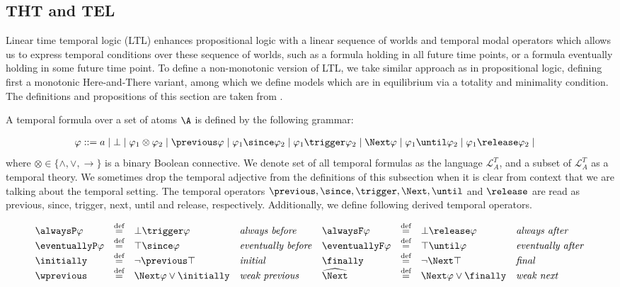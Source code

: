 \subsection{THT and TEL}

Linear time temporal logic (LTL) enhances propositional logic with a
linear sequence of worlds and temporal modal operators which allows us
to express temporal conditions over these sequence of worlds, such as
a formula holding in all future time points, or a formula eventually
holding in some future time point. To define a non-monotonic version
of LTL, we take similar approach as in propositional logic, defining
first a monotonic Here-and-There variant, among which we define models
which are in equilibrium via a totality and minimality condition. The
definitions and propositions of this section are taken from
\cite{agcadipescscvi20a}.

A temporal formula over a set of atoms $\A$ is defined by the
following grammar:

\begin{align*}
    \varphi ::= &\; a \mid \bot \mid
                  \varphi_1 \otimes \varphi_2 \mid
                  \previous \varphi \mid \varphi_1 \since \varphi_2 \mid \varphi_1 \trigger \varphi_2 \mid
                  \Next \varphi \mid \varphi_1 \until \varphi_2 \mid \varphi_1 \release \varphi_2 \mid                  
\end{align*}
where $\otimes \in \{ \wedge, \vee, \to \}$ is a binary Boolean
connective. We denote set of all temporal formulas as the language
$\mathcal{L}_{A}^{T}$, and a subset of $\mathcal{L}_{A}^{T}$ as a
temporal theory. We sometimes drop the temporal adjective from the
definitions of this subsection when it is clear from context that we
are talking about the temporal setting. The temporal operators
$\previous, \since, \trigger, \Next, \until$ and $\release$ are read as
previous, since, trigger, next, until and release,
respectively. Additionally, we define following derived temporal
operators.

\[
\begin{array}{l l l l l l l l}
\alwaysP \varphi & \defeq & \bot \trigger \varphi & \text{\emph{always before}} &
\alwaysF \varphi & \defeq & \bot \release \varphi & \text{\emph{always after}} \\
\eventuallyP \varphi & \defeq & \top \since \varphi & \text{\emph{eventually before}} &
\eventuallyF \varphi & \defeq & \top \until \varphi & \text{\emph{eventually after}} \\
\initially & \defeq & \lnot \previous \top & \text{\emph{initial}} &
\finally & \defeq & \lnot \Next \top & \text{\emph{final}} \\
\wprevious & \defeq & \Next \varphi \vee \initially & \text{\emph{weak previous}} &
\wnext & \defeq & \Next \varphi \vee \finally & \text{\emph{weak next}}
\end{array}
\]

